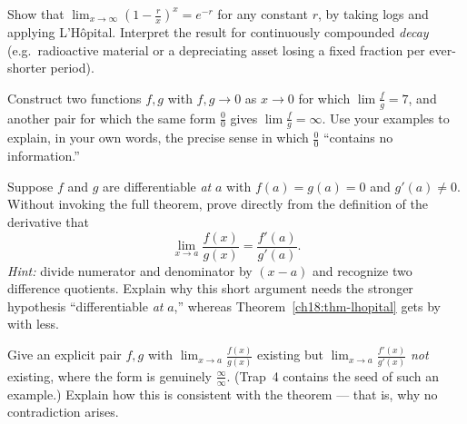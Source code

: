 \begin{exercise}
Show that $\displaystyle\lim_{x\to\infty}\left(1-\frac{r}{x}\right)^{x}=e^{-r}$ for any
constant $r$, by taking logs and applying L'H\^opital. Interpret the result for
continuously compounded \emph{decay} (e.g.\ radioactive material or a depreciating
asset losing a fixed fraction per ever-shorter period).
\end{exercise}

\begin{exercise}
Construct two functions $f,g$ with $f,g\to 0$ as $x\to 0$ for which
$\lim\tfrac{f}{g}=7$, and another pair for which the same form $\tfrac00$ gives
$\lim\tfrac{f}{g}=\infty$. Use your examples to explain, in your own words, the precise
sense in which $\tfrac00$ ``contains no information.''
\end{exercise}

\begin{exercise}
Suppose $f$ and $g$ are differentiable \emph{at} $a$ with $f(a)=g(a)=0$ and
$g'(a)\neq 0$. Without invoking the full theorem, prove directly from the definition of
the derivative that
\[
\lim_{x\to a}\frac{f(x)}{g(x)}=\frac{f'(a)}{g'(a)}.
\]
\emph{Hint:} divide numerator and denominator by $(x-a)$ and recognize two difference
quotients. Explain why this short argument needs the stronger hypothesis
``differentiable \emph{at} $a$,'' whereas Theorem~\ref{ch18:thm-lhopital} gets by with
less.
\end{exercise}

\begin{exercise}
Give an explicit pair $f,g$ with $\lim_{x\to a}\tfrac{f(x)}{g(x)}$ existing but
$\lim_{x\to a}\tfrac{f'(x)}{g'(x)}$ \emph{not} existing, where the form is genuinely
$\tfrac{\infty}{\infty}$. (Trap~4 contains the seed of such an example.) Explain how
this is consistent with the theorem --- that is, why no contradiction arises.
\end{exercise}
